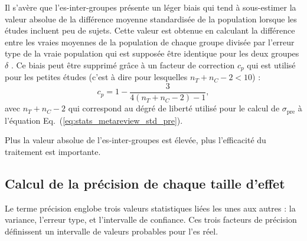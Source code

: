 Il s'avère que l'\gls{es}-inter-groupes présente un léger biais qui tend à sous-estimer la valeur absolue de la différence moyenne standardisée de la population
lorsque les études incluent peu de sujets. Cette valeur est obtenue en calculant la différence entre les vraies moyennes de la population de chaque groupe divisée 
par l'erreur type de la vraie population qui est supposée être identique pour les deux groupes $\delta$ \citep{Borenstein2009}. Ce biais peut être supprimé 
grâce à un facteur de correction $c_p$ qui est utilisé pour les petites études (c'est à dire pour lesquelles $n_T + n_C - 2 < 10$) : 
\begin{equation}
\label{eq:metareview_correction_factor}
c_p =  1 - \frac{3} {4(n_T + n_C - 2) - 1},
\end{equation} 
avec $n_T + n_C - 2$ qui correspond au dégré de liberté utilisé pour le calcul de $\sigma_{\text{pre}}$ à l'équation Eq.~(\ref{eq:stats_metareview_std_pre}).

Plus la valeur absolue de l'\gls{es}-inter-groupes est élevée, plus l'efficacité du traitement est importante.

\subsection{Calcul de la précision de chaque taille d'effet}

Le terme précision englobe trois valeurs statistiques liées les unes aux autres : la variance, l'erreur type, et l'intervalle de confiance.
Ces trois facteurs de précision définissent un intervalle de valeurs probables pour l'\gls{es} réel. 

